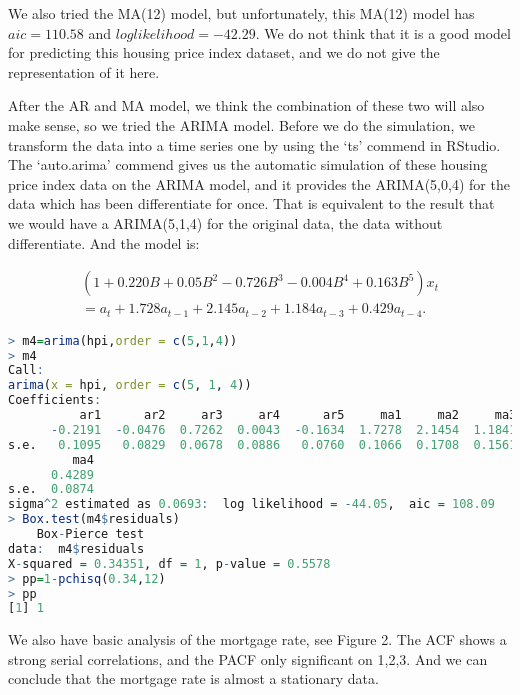 \documentclass[12pt,letterpaper]{article}
\begin{document}

We also tried the MA(12) model, but unfortunately, this MA(12) model has $aic = 110.58$ and $log likelihood = -42.29$. 
We do not think that it is a good model for predicting this housing price index dataset, and we do not give the representation of it here.

After the AR and MA model, we think the combination of these two will also make sense, so we tried the ARIMA model.
Before we do the simulation, we transform the data into a time series one by using the `ts' commend in RStudio.
The `auto.arima' commend gives us the automatic simulation of these housing price index data on the ARIMA model, and it provides the ARIMA(5,0,4) for the data which has been differentiate for once.
That is equivalent to the result that we would have a ARIMA(5,1,4) for the original data, the data without differentiate.
And the model is: 

\begin{equation}
\begin{aligned}
(1+0.220B+0.05B^2-0.726B^3-0.004B^4+0.163B^5)x_t \\
= a_t +1.728a_{t-1}+2.145a_{t-2}+1.184a_{t-3}+0.429a_{t-4}.
\end{aligned}
\end{equation}

{\footnotesize
\begin{lstlisting}[language=R]
> m4=arima(hpi,order = c(5,1,4))
> m4
Call: 
arima(x = hpi, order = c(5, 1, 4))
Coefficients:
          ar1      ar2     ar3     ar4      ar5     ma1     ma2     ma3
      -0.2191  -0.0476  0.7262  0.0043  -0.1634  1.7278  2.1454  1.1841
s.e.   0.1095   0.0829  0.0678  0.0886   0.0760  0.1066  0.1708  0.1561
         ma4
      0.4289
s.e.  0.0874
sigma^2 estimated as 0.0693:  log likelihood = -44.05,  aic = 108.09
> Box.test(m4$residuals)
	Box-Pierce test
data:  m4$residuals  
X-squared = 0.34351, df = 1, p-value = 0.5578
> pp=1-pchisq(0.34,12)
> pp
[1] 1 
\end{lstlisting}
}

We also have basic analysis of the mortgage rate, see Figure 2. 
The ACF shows a strong serial correlations, and the PACF only significant on 1,2,3.
And we can conclude that the mortgage rate is almost a stationary data.
\end{document}
